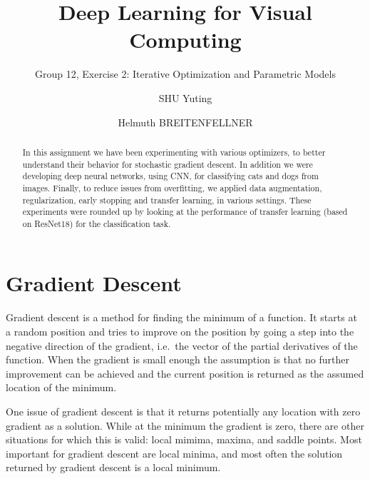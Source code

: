 \documentclass[sigconf,nonacm]{acmart}
\begin{document}
\title{Deep Learning for Visual Computing}
\subtitle{Group 12, Exercise 2: Iterative Optimization and Parametric Models}
\author{SHU Yuting}
\author{Helmuth BREITENFELLNER}
\begin{abstract}
In this assignment we have been experimenting with various optimizers,
to better understand their behavior for stochastic gradient
descent.
In addition we were developing deep neural networks, using CNN,
for classifying cats and dogs from images.
Finally, to reduce issues from overfitting, we applied data augmentation,
regularization, early stopping and transfer learning, in various settings.
These experiments were rounded up by looking at the performance of transfer
learning (based on ResNet18) for the classification task.
\end{abstract}
\maketitle

\section{Gradient Descent}

Gradient descent is a method for finding the minimum of a function.
It starts at a random position and tries to improve on the position
by going a step into the negative direction of the gradient,
i.e.\ the vector of the partial derivatives of the function.
When the gradient is small enough the assumption is that no further improvement
can be achieved and the current position is returned as the assumed location
of the minimum.

One issue of gradient descent is that it returns potentially any location with zero
gradient as a solution. While at the minimum the gradient is zero, there
are other situations for which this is valid: local mimima, maxima, and saddle points.
Most important for gradient descent are local minima, and most often the solution
returned by gradient descent is a local minimum.
\end{document}
